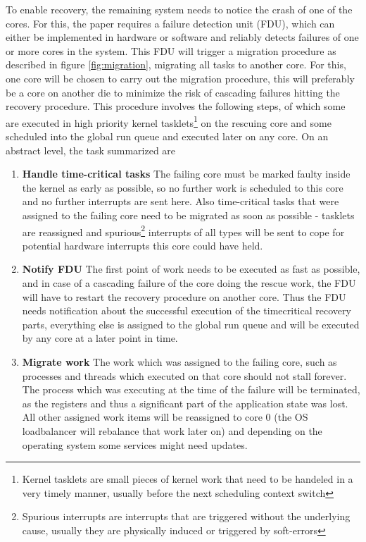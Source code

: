 \documentclass[a4paper,10pt,twoside]{article}
\begin{document}
To enable recovery, the remaining system needs to notice the crash of one of the cores. For this, the paper requires a failure detection unit (FDU), which can either be implemented in hardware or software and reliably detects failures of one or more cores in the system. This FDU will trigger a migration procedure as described in figure \ref{fig:migration}, migrating all tasks to another core. For this, one core will be chosen to carry out the migration procedure, this will preferably be a core on another die to minimize the risk of cascading failures hitting the recovery procedure. %
This procedure involves the following steps, of which some are executed in high priority kernel tasklets\footnote{Kernel tasklets are small pieces of kernel work that need to be handeled in a very timely manner, usually before the next scheduling context switch} on the rescuing core and some scheduled into the global run queue and executed later on any core. On an abstract level, the task summarized are
\begin{enumerate}
	\item \textbf{Handle time-critical tasks} The failing core must be marked faulty inside the kernel as early as possible, so no further work is scheduled to this core and no further interrupts are sent here. Also time-critical tasks that were assigned to the failing core need to be migrated as soon as possible - tasklets are reassigned and spurious\footnote{Spurious interrupts are interrupts that are triggered without the underlying cause, usually they are physically induced or triggered by soft-errors} interrupts of all types will be sent to cope for potential hardware interrupts this core could have held.
	\item \textbf{Notify FDU} The first point of work needs to be executed as fast as possible, and in case of a cascading failure of the core doing the rescue work, the FDU will have to restart the recovery procedure on another core. Thus the FDU needs notification about the successful execution of the timecritical recovery parts, everything else is assigned to the global run queue and will be executed by any core at a later point in time.
	\item \textbf{Migrate work} The work which was assigned to the failing core, such as processes and threads which executed on that core should not stall forever. The process which was executing at the time of the failure will be terminated, as the registers and thus a significant part of the application state was lost. All other assigned work items will be reassigned to core 0 (the OS loadbalancer will rebalance that work later on) and depending on the operating system some services might need updates.
\end{enumerate}
\end{document}
